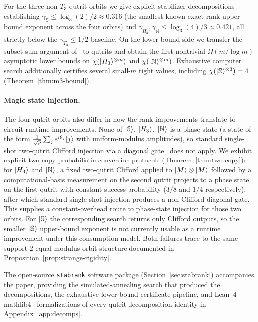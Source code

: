 \documentclass[11pt]{article}
\theoremstyle{definition}
\newcommand{\microspace}{\mspace{0.5mu}}
\newcommand{\ket}[1]{\lvert\microspace #1 \microspace \rangle}
\newcommand{\chiR}{\chi}
\newcommand{\Strange}{\ket{\mathbb{S}}}
\newcommand{\Hth}{\ket{H_3}}
\newcommand{\Norrell}{\ket{\mathbb{N}}}
\begin{document}
	For the three non-$T_3$ qutrit orbits we give explicit stabilizer
	decompositions establishing
	$\gamma_{\mathbb{S}} \le \log_3(2)/2 \approx 0.316$ (the smallest
	known exact-rank upper-bound exponent across the four orbits)
	and $\gamma_{H_3}, \gamma_{\mathbb{N}} \le \log_3(4)/3 \approx 0.421$,
	all strictly below the $\gamma_{T_3} \le 1/2$ baseline. On the
	lower-bound side we transfer the subset-sum argument
	of~\cite{lovitz2022techniques} to qutrits and obtain the first
	nontrivial $\Omega(m / \log m)$ asymptotic lower bounds on
	$\chiR(\Hth^{\otimes m})$ and $\chiR(\Norrell^{\otimes m})$.
	Exhaustive computer search additionally certifies several small-$m$
	tight values, including $\chiR(\Strange^{\otimes 3}) = 4$
	(Theorem~\ref{thm:m3-bound}).

	\paragraph{Magic state injection.}
	The four qutrit orbits also differ in how the rank improvements
	translate to circuit-runtime improvements. None of $\Strange$, $\Hth$,
	$\Norrell$ is a phase state (a state of the form
	$\frac{1}{\sqrt p} \sum_j e^{i \theta_j} \ket j$ with
	uniform-modulus amplitudes), so standard single-shot two-qutrit
	Clifford injection via a diagonal
	gate~\cite{anwar2012qutrit, howard2012qudit, cui2017diagonal}
	does not apply. We exhibit explicit two-copy probabilistic
	conversion protocols (Theorem~\ref{thm:two-copy}): for $\Hth$
	and $\Norrell$, a fixed
	two-qutrit Clifford applied to $\ket{M} \otimes \ket{M}$ followed
	by a computational-basis measurement on the second qutrit projects
	to a phase state on the first qutrit with constant success
	probability ($3/8$ and $1/4$ respectively), after which standard
	single-shot injection produces a non-Clifford diagonal gate. This
	supplies a constant-overhead route to phase-state injection for
	those two orbits. For $\Strange$ the corresponding search returns
	only Clifford outputs, so the smaller $\Strange$ upper-bound exponent is not
	currently usable as a runtime improvement under this consumption
	model. Both failures trace to the same support-$2$ equal-modulus
	orbit structure documented in
	Proposition~\ref{prop:strange-rigidity}.
	
	The open-source \texttt{stabrank} software package
	(Section~\ref{sec:stabrank}) accompanies the paper, providing the
	simulated-annealing search that produced the decompositions, the
	exhaustive lower-bound certificate pipeline, and
	Lean~4~\cite{moura2021lean4} +
	mathlib4~\cite{mathlib2020} formalizations of every qutrit
	decomposition identity in Appendix~\ref{app:decomps}.
	
\end{document}
